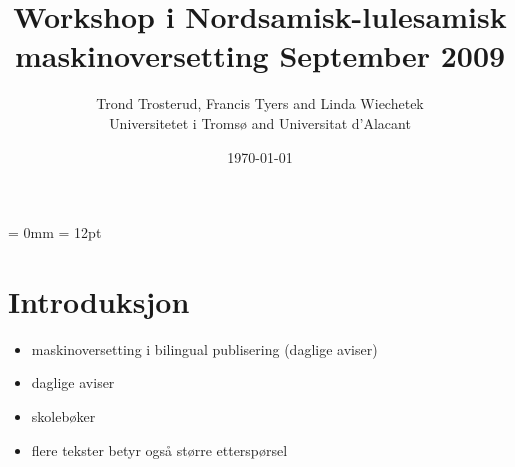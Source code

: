 \documentclass[a4paper,english,12pt]{article}
\begin{document}
\setcounter{secnumdepth}{3}
\setcounter{tocdepth}{3}
\begin{spacing}{1.0}


\newcommand{\tx}{\mbox{t\hspace{-.35em}-}} %

%  


\title{{\Large Workshop i Nordsamisk-lulesamisk maskinoversetting September 2009}} %




\author{Trond Trosterud, Francis Tyers and Linda Wiechetek \\
		Universitetet i Tromsø and Universitat d'Alacant}
\date{\today}

\maketitle




\thispagestyle{empty} %

\setcounter{page}{1} %

\parindent = 0mm
\parskip = 12pt



\section{Introduksjon}

\begin{itemize}
\item maskinoversetting i bilingual publisering (daglige aviser)
\item daglige aviser
\item skolebøker
\item flere tekster betyr også større etterspørsel
\end{itemize}


\end{spacing}
\end{document}

